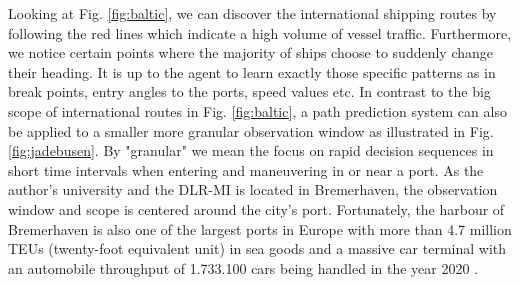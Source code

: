 Looking at Fig. \ref{fig:baltic}, we can discover the international shipping routes by following the red lines which indicate a high volume of vessel traffic. Furthermore, we notice certain points where the majority of ships choose to suddenly change their heading. It is up to the agent to learn exactly those specific patterns as in break points, entry angles to the ports, speed values etc. In contrast to the big scope of international routes in Fig. \ref{fig:baltic}, a path prediction system can also be applied to a smaller more granular observation window as illustrated in Fig. \ref{fig:jadebusen}. By "granular" we mean the focus on rapid decision sequences in short time intervals when entering and maneuvering in or near a port. As the author's university and the DLR-MI is located in Bremerhaven, the observation window and scope is centered around the city's port. Fortunately, the harbour of Bremerhaven is also one of the largest ports in Europe with more than 4.7 million TEUs (twenty-foot equivalent unit) in sea goods and a massive car terminal with an automobile throughput of 1.733.100 cars being handled in the year 2020  \cite[]{bremenports}.